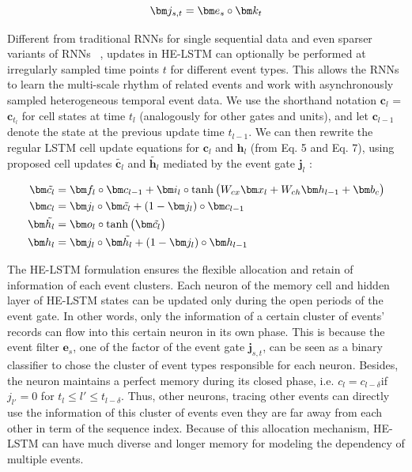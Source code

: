 \documentclass[letterpaper]{article} %
\begin{document}
\begin{equation}
\setlength{\abovedisplayskip}{3pt}
\bm j_{s,t} = \bm e_s \circ \bm k_t
\setlength{\belowdisplayskip}{3pt}
\end{equation}


Different from traditional RNNs for single sequential data and even sparser variants of RNNs ~\cite{koutnik2014clockwork}, updates in HE-LSTM
can optionally be performed at irregularly sampled time points $t$ for different event types.
This allows the RNNs to learn the multi-scale rhythm of related events and work with asynchronously sampled
heterogeneous temporal event data.
We use the shorthand notation $\bm c_l$ = $\bm c_{t_l}$ for cell
states at time $t_l$ (analogously for other gates and units), and let $\bm c_{l-1}$ denote the state at the previous
update time $t_{l-1}$. We can then rewrite the regular LSTM cell update equations for $\bm c_l$ and $\bm h_l$ (from
Eq. 5 and Eq. 7), using proposed cell updates $\tilde{\bm c_l}$ and $\tilde{\bm h_l}$ mediated by the event gate $\bm j_l$ :

\begin{align}
\setlength{\abovedisplayskip}{3pt}
\bm \tilde{c_l} &= \bm f_l \circ \bm c_{l-1} + \bm i_l \circ \tanh\big (W_{cx}\bm x_l+ W_{ch} \bm h_{l-1} + \bm b_c \big) \\
\bm c_l &= \bm j_l \circ \bm \tilde{c_l} + (1-\bm j_l) \circ \bm c_{l-1}\\
\bm \tilde{h_l} &= \bm o_l \circ \tanh \big( \bm \tilde{c_l} \big)\\
\bm h_l &= \bm j_l \circ \bm \tilde{h_l} + (1-\bm j_l) \circ \bm h_{l-1}
\setlength{\belowdisplayskip}{3pt}
\end{align}

The HE-LSTM formulation ensures
the flexible allocation and retain of information of each event clusters.
Each neuron of the memory cell and hidden layer of HE-LSTM states can be updated only during the open periods of the event gate.
In other words, only the information of a certain cluster of events' records can flow into this certain neuron in its own phase.
This is because the event filter $\bm e_s$, one of the factor of the event gate $\bm j_{s,t}$, can be seen as a binary classifier to chose the cluster of event types responsible for each neuron.
Besides, the neuron maintains a perfect memory
during its closed phase, i.e. $c_l = c_{l-\delta} $if $j_{l'} = 0$ for $ t_l \leq  l' \leq t_{l-\delta}$. Thus, other neurons, tracing other events can directly use the information of this cluster of events even they are far away from each other in term of the sequence index.
Because of this allocation mechanism, HE-LSTM can have much  diverse and longer memory for modeling the dependency of multiple events.
\end{document}
